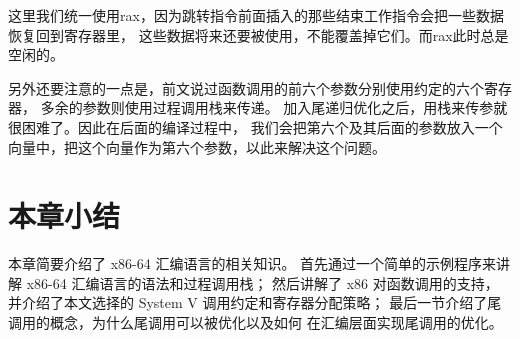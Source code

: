 这里我们统一使用rax，因为跳转指令前面插入的那些结束工作指令会把一些数据恢复回到寄存器里，
这些数据将来还要被使用，不能覆盖掉它们。而rax此时总是空闲的。

另外还要注意的一点是，前文说过函数调用的前六个参数分别使用约定的六个寄存器，
多余的参数则使用过程调用栈来传递。
加入尾递归优化之后，用栈来传参就很困难了。因此在后面的编译过程中，
我们会把第六个及其后面的参数放入一个向量中，把这个向量作为第六个参数，以此来解决这个问题。

\section{本章小结}

本章简要介绍了 x86-64 汇编语言的相关知识。
首先通过一个简单的示例程序来讲解 x86-64 汇编语言的语法和过程调用栈；
然后讲解了 x86 对函数调用的支持，
并介绍了本文选择的 System V 调用约定和寄存器分配策略；
最后一节介绍了尾调用的概念，为什么尾调用可以被优化以及如何
在汇编层面实现尾调用的优化。
